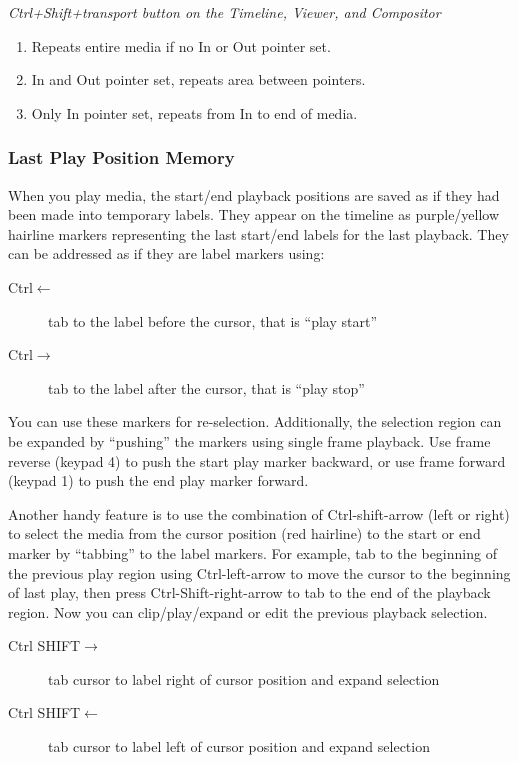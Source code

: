 \emph{Ctrl+Shift+transport button on the Timeline, Viewer, and Compositor}

\begin{enumerate}
    \item Repeats entire media if no In or Out pointer set.
    \item  In and Out pointer set, repeats area between pointers.
    \item  Only In pointer set, repeats from In to end of media.
\end{enumerate}

\subsubsection*{Last Play Position Memory}%
\label{ssub:last_play_position_memory}


When you play media, the start/end playback positions are saved as if they had been made into temporary labels.  
They appear on the timeline as purple/yellow hairline markers representing the last start/end labels for the last playback. 
They can be addressed as if they are label markers using:

\begin{description}
    \item[Ctrl$\leftarrow$]   tab to the label before the cursor, that is “play start”
    \item[Ctrl$\rightarrow$]   tab to the label after the cursor, that is “play stop”
\end{description}


You can use these markers for re-selection.  
Additionally, the selection region can be expanded by “pushing” the markers using single frame playback.  
Use frame reverse (keypad 4) to push the start play marker backward, or use frame forward (keypad 1) to push the end play marker forward.

Another handy feature is to use the combination of Ctrl-shift-arrow (left or right) to select the media from the cursor position (red hairline) to the start or end marker by “tabbing” to the label markers.  
For example, tab to the beginning of the previous play region using Ctrl-left-arrow to move the cursor to the beginning of last play, then press Ctrl-Shift-right-arrow to tab to the end of the playback region. 
Now you can clip/play/expand or edit the previous playback selection.

\begin{description}
    \item[Ctrl SHIFT$\rightarrow$] 	  tab cursor to label right of cursor position and expand selection
    \item[Ctrl SHIFT$\leftarrow$] 	  tab cursor to label left of cursor position and expand selection
\end{description}


